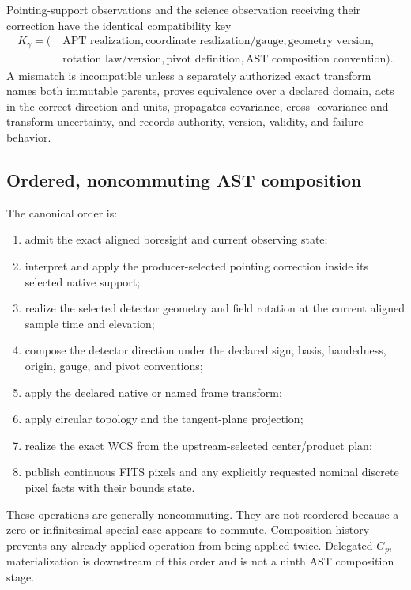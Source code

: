 Pointing-support observations and the science observation receiving their
correction have the identical compatibility key
\begin{equation}
 \begin{aligned}
 K_\gamma=(\;&\text{APT realization},
 \text{coordinate realization/gauge},\text{geometry version},\\
 &\text{rotation law/version},\text{pivot definition},
 \text{AST composition convention}).
 \end{aligned}
 \label{eq:geometry-key}
\end{equation}
A mismatch is incompatible unless a separately authorized exact transform
names both immutable parents, proves equivalence over a declared domain,
acts in the correct direction and units, propagates covariance, cross-
covariance and transform uncertainty, and records authority, version,
validity, and failure behavior.

\subsection{Ordered, noncommuting AST composition}
\label{sec:ordered-composition}

The canonical order is:
\begin{enumerate}[label=\arabic*.]
  \item admit the exact aligned boresight and current observing state;
  \item interpret and apply the producer-selected pointing correction inside
        its selected native support;
  \item realize the selected detector geometry and field rotation at the
        current aligned sample time and elevation;
  \item compose the detector direction under the declared sign, basis,
        handedness, origin, gauge, and pivot conventions;
  \item apply the declared native or named frame transform;
  \item apply circular topology and the tangent-plane projection;
  \item realize the exact WCS from the upstream-selected center/product plan;
  \item publish continuous FITS pixels and any explicitly requested nominal
        discrete pixel facts with their bounds state.
\end{enumerate}
These operations are generally noncommuting.  They are not reordered because
a zero or infinitesimal special case appears to commute.  Composition history
prevents any already-applied operation from being applied twice. Delegated
$G_{pi}$ materialization is downstream of this order and is not a ninth AST
composition stage.

